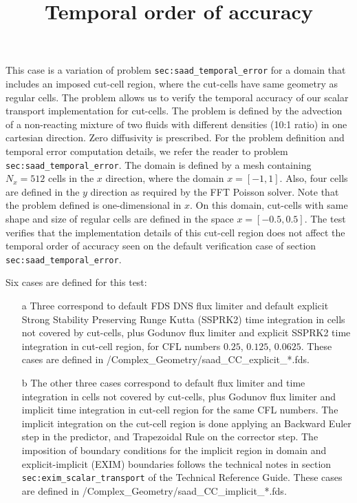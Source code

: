 \documentclass[12pt]{article}
\begin{document}
This case is a variation of problem \texttt{sec:saad\_temporal\_error} for a domain that includes an imposed cut-cell region, where the cut-cells have same geometry as regular cells. The problem allows us to verify the temporal accuracy of our scalar transport implementation for cut-cells. The problem is defined by the advection of a non-reacting mixture of two fluids with different densities (10:1 ratio) in one cartesian direction. Zero diffusivity is prescribed. For the problem definition and temporal error computation details, we refer the reader to problem \texttt{sec:saad\_temporal\_error}.
The domain is defined by a mesh containing $N_x=512$ cells in the $x$ direction, where the domain $x=[-1,1]$. Also, four cells are defined in the $y$ direction as required by the FFT Poisson solver. Note that the problem defined is one-dimensional in $x$. 
On this domain, cut-cells with same shape and size of regular cells are defined in the space $x=[-0.5,0.5]$. The test verifies that the implementation details of this cut-cell region does not affect the temporal order of accuracy seen on the default verification case of section \texttt{sec:saad\_temporal\_error}.

\title{Temporal order of accuracy}

Six cases are defined for this test:
%
\begin{enumerate}
 \item[a]  Three correspond to default FDS DNS flux limiter and default explicit Strong Stability Preserving Runge Kutta (SSPRK2) time integration in cells not covered by cut-cells, plus Godunov flux limiter and explicit SSPRK2 time integration in cut-cell region, for CFL numbers $0.25$, $0.125$, $0.0625$. These cases are defined in {\ct /Complex\_Geometry/saad\_CC\_explicit\_*.fds}. 
 
  \item[b] The other three cases correspond to default flux limiter and time integration in cells not covered by cut-cells, plus Godunov flux limiter and implicit time integration in cut-cell region for the same CFL numbers. The implicit integration on the cut-cell region is done applying an Backward Euler step in the predictor, and Trapezoidal Rule on the corrector step. The imposition of boundary conditions for the implicit region in domain and explicit-implicit (EXIM) boundaries follows the technical notes in section \texttt{sec:exim\_scalar\_transport} of the Technical Reference Guide. These cases are defined in {\ct /Complex\_Geometry/saad\_CC\_implicit\_*.fds}.
  
\end{enumerate}
%
\end{document}
